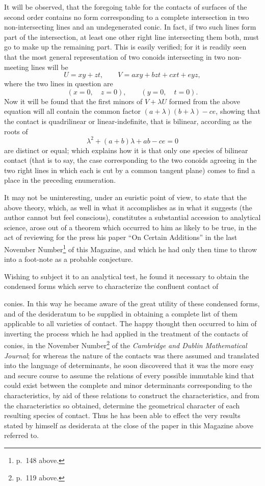 \documentclass[11pt]{article}
\newcommand{\sourcepage}[1]{\marginpar{\scriptsize p.~#1}}
\begin{document}
{{It will be observed, that the foregoing table for the contacts of surfaces of the second order contains no form corresponding to a complete intersection in two non-intersecting lines and an undegenerated conic. In fact, if two such lines form part of the intersection, at least one other right line intersecting them both, must go to make up the remaining part. This is easily verified; for it is readily seen that the most general representation of two conoids intersecting in two non-meeting lines will be
\[
U=xy+zt,
\qquad
V=axy+bzt+cxt+eyz,
\]
where the two lines in question are
\[
(x=0,\quad z=0),
\qquad
(y=0,\quad t=0).
\]
Now it will be found that the first minors of $V+\lambda U$ formed from the above equation will all contain the common factor $(a+\lambda)(b+\lambda)-ce$, showing that the contact is quadrilinear or linear-indefinite, that is bilinear, according as the roots of
\[
\lambda^2+(a+b)\lambda+ab-ce=0
\]
are distinct or equal; which explains how it is that only one species of bilinear contact (that is to say, the case corresponding to the two conoids agreeing in the two right lines in which each is cut by a common tangent plane) comes to find a place in the preceding enumeration.

It may not be uninteresting, under an euristic point of view, to state that the above theory, which, as well in what it accomplishes as in what it suggests (the author cannot but feel conscious), constitutes a substantial accession to analytical science, arose out of a theorem which occurred to him as likely to be true, in the act of reviewing for the press his paper ``On Certain Additions'' in the last November Number\footnote{p.~148 above.} of this Magazine, and which he had only then time to throw into a foot-note as a probable conjecture.

Wishing to subject it to an analytical test, he found it necessary to obtain the condensed forms which serve to characterize the confluent contact of

\sourcepage{240}
conies. In this way he became aware of the great utility of these condensed forms, and of the desideratum to be supplied in obtaining a complete list of them applicable to all varieties of contact. The happy thought then occurred to him of inverting the process which he had applied in the treatment of the contacts of conies, in the November Number\footnote{p.~119 above.} of the \emph{Cambridge and Dublin Mathematical Journal}; for whereas the nature of the contacts was there assumed and translated into the language of determinants, he soon discovered that it was the more easy and secure course to assume the relations of every possible immutable kind that could exist between the complete and minor determinants corresponding to the characteristics, by aid of these relations to construct the characteristics, and from the characteristics so obtained, determine the geometrical character of each resulting species of contact. Thus he has been able to effect the very results stated by himself as desiderata at the close of the paper in this Magazine above referred to.

}}
\end{document}
